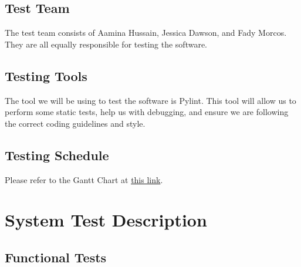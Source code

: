 \documentclass[12pt, titlepage]{article}
\begin{document}
\subsection{Test Team}
The test team consists of Aamina Hussain, Jessica Dawson, and Fady Morcos. They are all equally responsible for testing the software.
\subsection{Testing Tools}
The tool we will be using to test the software is Pylint. This tool will allow us to perform some static tests, help us with debugging, and ensure we are following the correct coding guidelines and style.
\subsection{Testing Schedule}
Please refer to the Gantt Chart at
\href{https://gitlab.cas.mcmaster.ca/3xa3-l3-g10/3xa3-l3-g10/-/tree/main/ProjectSchedule}{this link}.

\section{System Test Description}
	
\subsection{Functional Tests}
\end{document}
